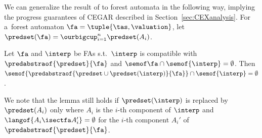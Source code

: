 {%


We can generalize the result of \cite{artmc} to forest automata in the
following way,
implying the progress guarantees of CEGAR described in Section~\ref{sec:CEXanalysis}.
For a~forest automaton $\fa = \tuple{\tas,\valuation}$, let $\predset(\fa) =  \ourbigcup_{i=1}^n\predset({A_i})$.
\begin{lemma}
Let $\fa$ and $\interp$ be FAs s.t.~$\interp$ is compatible with $\predabstraof{\predset}{\fa}$ and
$\semof\fa\cap\semof{\interp} = \emptyset$.
Then
$\semof{\predabstraof{\predset\cup\predset(\interp)}{\fa}} \cap \semof{\interp} = \emptyset$.
\end{lemma}
%
We note that the lemma still holds if $\predset(\interp)$ is replaced by
$\predset({A_i})$ only where $A_i$ is the $i$-th component of $\interp$ and $\langof{A_i \isectfa A_i'} = \emptyset$ for the $i$-th component $A_i'$ of $\predabstraof{\predset}{\fa}$. 



}
